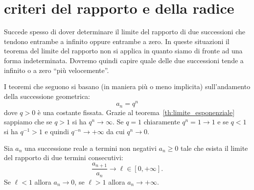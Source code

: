 \section{criteri del rapporto e della radice}

Succede spesso di dover determinare il limite
del rapporto di due successioni che tendono entrambe a infinito
oppure entrambe a zero.
In queste situazioni il teorema del limite del rapporto non
si applica in quanto siamo di fronte ad una forma indeterminata.
Dovremo quindi capire quale delle due successioni
tende a infinito o a zero ``più velocemente''.

I teoremi che seguono si basano (in maniera più o meno implicita)
sull'andamento della successione geometrica:
\[
  a_n = q^n
\]
dove $q>0$ è una costante fissata.
Grazie al teorema~\ref{th:limite_esponenziale}
sappiamo che se $q>1$ si ha $q^n\to \infty$.
Se $q=1$ chiaramente $q^n=1\to 1$
e se $q<1$ si ha $q^{-1}>1$ e quindi $q^{-n} \to +\infty$
da cui $q^n \to 0$.

\begin{theorem}
\label{th:criterio_rapporto}
  Sia $a_n$ una successione reale a termini non negativi
  $a_n \ge 0$ tale che esista il limite del rapporto di due termini consecutivi:
  \[
     \frac{a_{n+1}}{a_n} \to \ell \in [0,+\infty].
  \]
  Se $\ell < 1$ allora $a_n \to 0$, se $\ell >1$ allora $a_n \to +\infty$.
\end{theorem}
%
\begin{comment}
\begin{proof}\footnote{%
  la dimostrazione di questo teorema si potrebbe fare in maniera
  molto simile alla dimostrazione del teorema~\ref{th:criterio_radice}
  senza tirare in ballo il teorema~\ref{th:criterio_cesaro} che è decisamente più complesso.
  }
Grazie al teorema~\ref{th:criterio_cesaro} sappiamo
che $\sqrt[n]{a_n}\to \ell$ e quindi il risultato
segue direttametne dal teorema~\ref{th:criterio_radice}.
\end{proof}
\end{comment}


